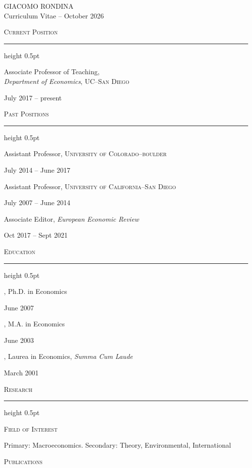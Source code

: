 \documentclass[12pt,letterpaper]{article}
\newcommand{\cvblank}{\par\vspace{11pt}}
\newcommand{\cvsection}[1]{%
  \par\Needspace{5\baselineskip}%
  {\fontsize{13}{14.8}\selectfont\scshape #1\par}%
  \nobreak\vspace{3pt}\hrule height 0.5pt\nobreak\vspace{10pt}}
\newcommand{\cvsubsection}[2][0.125in]{%
  \par\Needspace{4\baselineskip}%
  {\leftskip=#1\relax\scshape #2\par}\nobreak}
\newcommand{\cvtext}[2][0pt]{%
  \par\begingroup\raggedright\leftskip=#1\relax\noindent #2\par\endgroup}
\newlength{\cvrightdatewidth}
\newcommand{\cvdated}[2]{%
  \par\noindent%
  \begin{minipage}[t]{\dimexpr\linewidth-\cvrightdatewidth-0.12in\relax}%
  \raggedright #1\end{minipage}\hspace{0.12in}%
  \begin{minipage}[t]{\cvrightdatewidth}%
  \raggedleft\fontsize{10}{13.8}\selectfont #2\end{minipage}\par}
\begin{document}
\fontsize{12}{13.8}\selectfont
\begin{center}
GIACOMO RONDINA\\
Curriculum Vitae -- October 2026
\end{center}
\vspace{20pt}

\cvsection{Current Position}

\cvdated{Associate Professor of Teaching,\\\textit{Department of Economics}, {\scshape UC--San Diego}}{July 2017 -- present}

\cvblank


\cvsection{Past Positions}

\cvdated{Assistant Professor, {\scshape University of Colorado--boulder}}{July 2014 -- June 2017}

\cvdated{Assistant Professor, {\scshape University of California--San Diego}}{July 2007 -- June 2014}

\cvdated{Associate Editor, \textit{European Economic Review}}{Oct 2017 -- Sept 2021}

\cvblank


\cvsection{Education}

\cvdated{\hspace{0.125in}{\scshape University of Wisconsin--Madison}, {\fontsize{10}{13.8}\selectfont Ph.D. in Economics}}{June 2007}

\cvdated{\hspace{0.125in}{\scshape University of Wisconsin--Madison}, {\fontsize{10}{13.8}\selectfont M.A. in Economics}}{June 2003}

\cvdated{\hspace{0.125in}{\scshape Luiss ``Guido Carli''-rome}, {\fontsize{10}{13.8}\selectfont Laurea in Economics, \textit{Summa Cum Laude}}}{March 2001}

\cvblank


\cvsection{Research}

\cvsubsection[0.125in]{Field of Interest}

\cvblank

\cvtext[0.2in]{Primary: Macroeconomics. Secondary: Theory, Environmental, International}

\cvblank

\cvsubsection[0.125in]{Publications}

\cvblank
\end{document}
